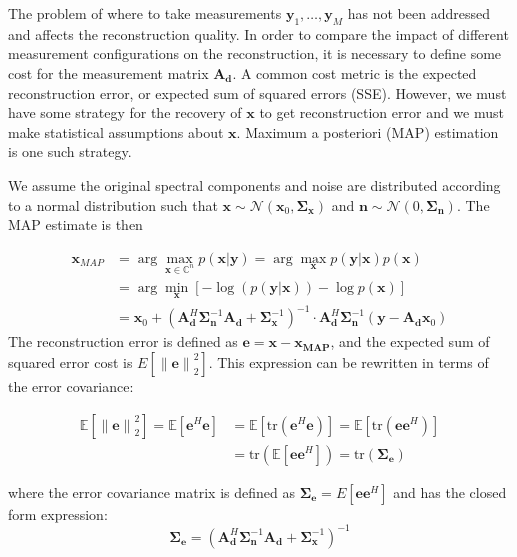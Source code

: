 \documentclass{article}
\providecommand{\norm}[1]{\left\lVert#1\right\rVert}
\begin{document}
The problem of where to take measurements $\bm{y}_1, \dots, \bm{y}_M$ has not
been addressed and affects the reconstruction quality.  In order to
compare the impact of different measurement configurations on the reconstruction, it is
necessary to define some cost for the measurement matrix $\bm{A}_{\bm{d}}$.  A common cost
metric is the expected reconstruction error, or expected sum of squared errors
(SSE). However, we must have some strategy for the recovery of $\bm{x}$ to get
reconstruction error and we must make statistical assumptions about $\bm{x}$.
Maximum a posteriori (MAP) estimation is one such strategy.

We assume the original spectral components and noise are distributed according to a
normal distribution such that $\bm{x} \sim \mathcal{N}(\bm{x}_{0}, \bm{\Sigma}_{\bm{x}})$ and
$\bm{n} \sim \mathcal{N}(0, \bm{\Sigma}_{\bm{n}})$.  The MAP estimate is then

$$
\begin{aligned}
  \bm{x}_{MAP} &= \arg \max_{\bm{x} \in \mathbb{C}^n} p(\bm{x} | \bm{y})
  = \arg \max_{\bm{x}} p(\bm{y}|\bm{x}) p(\bm{x})\\
  &= \arg \min_{\bm{x}} \left[  - \log(p(\bm{y}|\bm{x})) - \log
  p(\bm{x})\right] \\
  &= \bm{x}_0 + \left( \bm{A}_{\bm{d}}^H\bm{\Sigma}_{\bm{n}}^{-1} \bm{A}_{\bm{d}} +
    \bm{\Sigma}_{\bm{x}}^{-1}\right)^{-1}
  \cdot  \bm{A}_{\bm{d}}^H \bm{\Sigma}_{\bm{n}}^{-1} (\bm{y} - \bm{A}_{\bm{d}} \bm{x}_0)
\end{aligned}
$$
The reconstruction error is defined as $\bm{e} = \bm{x} - \bm{x_{\text{MAP}}}$,
and the expected sum of squared error cost is $E[\norm{\bm{e}}_2^2]$. This
expression can be rewritten in terms of the error covariance:

\begin{align*}
\mathbb{E}[\norm{\bm{e}}_2^2] =  \mathbb{E}[\bm{e}^H\bm{e}] & = \mathbb{E}[\text{tr}(\bm{e}^H\bm{e})] = \mathbb{E}[\text{tr}(\bm{e}\bm{e}^H)] \\
& = \text{tr}(\mathbb{E}[\bm{e}\bm{e}^H]) = \text{tr}(\bm{\Sigma}_{\bm{e}})
\end{align*}

where the error covariance matrix is defined as $\bm{\Sigma}_{\bm{e}} =
E[\bm{e}\bm{e}^H]$ and has the closed form expression:
\begin{equation}
\bm{\Sigma}_{\bm{e}} = \left( \bm{A}_{\bm{d}}^H\bm{\Sigma}_{\bm{n}}^{-1} \bm{A}_{\bm{d}} +
    \bm{\Sigma}_{\bm{x}}^{-1}\right)^{-1}
\end{equation}
\end{document}

